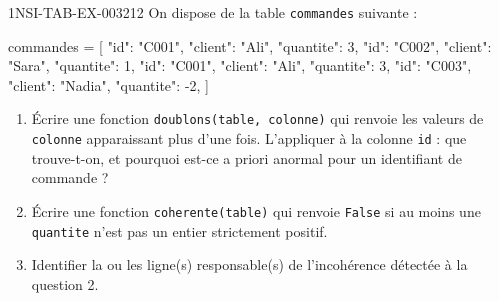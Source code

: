 \begin{exercice}{1NSI-TAB-EX-003}{2}{12}
On dispose de la table \lstinline{commandes} suivante :
\begin{python}
commandes = [
    {"id": "C001", "client": "Ali", "quantite": 3},
    {"id": "C002", "client": "Sara", "quantite": 1},
    {"id": "C001", "client": "Ali", "quantite": 3},
    {"id": "C003", "client": "Nadia", "quantite": -2},
]
\end{python}
\begin{enumerate}
  \item Écrire une fonction \lstinline{doublons(table, colonne)} qui renvoie les valeurs de \lstinline{colonne} apparaissant plus d'une fois. L'appliquer à la colonne \lstinline{id} : que trouve-t-on, et pourquoi est-ce a priori anormal pour un identifiant de commande ?
  \item Écrire une fonction \lstinline{coherente(table)} qui renvoie \lstinline{False} si au moins une \lstinline{quantite} n'est pas un entier strictement positif.
  \item Identifier la ou les ligne(s) responsable(s) de l'incohérence détectée à la question 2.
\end{enumerate}
\end{exercice}
